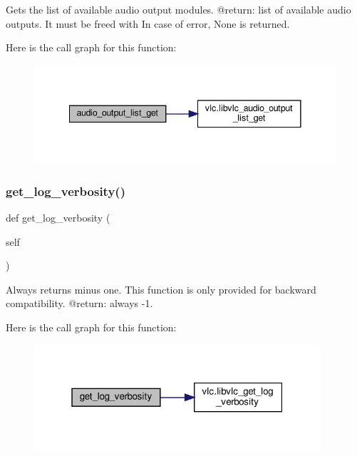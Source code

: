 \begin{DoxyVerb}Gets the list of available audio output modules.
@return: list of available audio outputs. It must be freed with In case of error, None is returned.
\end{DoxyVerb}
 Here is the call graph for this function\+:
\nopagebreak
\begin{figure}[H]
\begin{center}
\leavevmode
\includegraphics[width=341pt]{classvlc_1_1_instance_a3f066d48b8d8447cc7c5461e69187969_cgraph}
\end{center}
\end{figure}
\mbox{\label{classvlc_1_1_instance_a02e8a90bdd9f1458093c13d1d9d4e903}} 
\subsubsection{\texorpdfstring{get\+\_\+log\+\_\+verbosity()}{get\_log\_verbosity()}}
{\footnotesize\ttfamily def get\+\_\+log\+\_\+verbosity (\begin{DoxyParamCaption}\item[{}]{self }\end{DoxyParamCaption})}

\begin{DoxyVerb}Always returns minus one.
This function is only provided for backward compatibility.
@return: always -1.
\end{DoxyVerb}
 Here is the call graph for this function\+:
\nopagebreak
\begin{figure}[H]
\begin{center}
\leavevmode
\includegraphics[width=301pt]{classvlc_1_1_instance_a02e8a90bdd9f1458093c13d1d9d4e903_cgraph}
\end{center}
\end{figure}
\mbox{\label{classvlc_1_1_instance_a5dd84157243a0595b4be8e4d3d884395}} 

